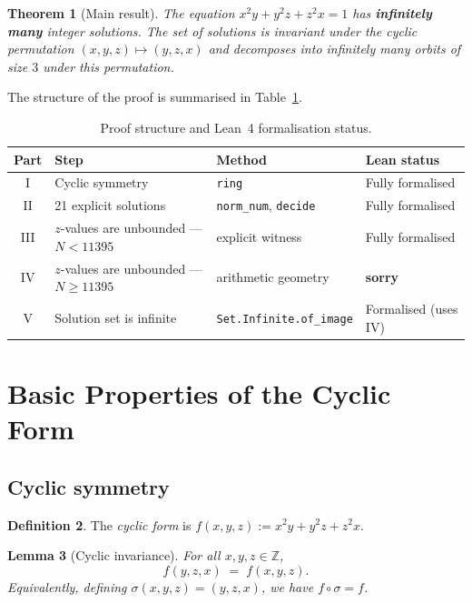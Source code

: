 \documentclass[12pt,a4paper]{article}
\newtheorem{theorem}{Theorem}[section]
\newtheorem{lemma}[theorem]{Lemma}
\theoremstyle{definition}
\newtheorem{definition}[theorem]{Definition}
\newcommand{\Z}{\mathbb{Z}}
\begin{document}
\begin{theorem}[Main result]\label{thm:main}
  The equation $x^2y + y^2z + z^2x = 1$ has \textbf{infinitely many}
  integer solutions.  The set of solutions is invariant under the
  cyclic permutation $(x,y,z)\mapsto(y,z,x)$ and decomposes into
  infinitely many orbits of size $3$ under this permutation.
\end{theorem}

The structure of the proof is summarised in Table~\ref{tab:overview}.

\begin{table}[h]
\centering
\caption{Proof structure and Lean~4 formalisation status.}
\label{tab:overview}
\begin{tabular}{clll}
\toprule
\textbf{Part} & \textbf{Step} & \textbf{Method} & \textbf{Lean status} \\
\midrule
I   & Cyclic symmetry & \texttt{ring} & Fully formalised \\
II  & 21 explicit solutions & \texttt{norm\_num}, \texttt{decide} & Fully formalised \\
III & $z$-values are unbounded — $N < 11395$ & explicit witness & Fully formalised \\
IV  & $z$-values are unbounded — $N \ge 11395$ & arithmetic geometry & \textbf{sorry} \\
V   & Solution set is infinite & \texttt{Set.Infinite.of\_image} & Formalised (uses IV) \\
\bottomrule
\end{tabular}
\end{table}

\section{Basic Properties of the Cyclic Form}\label{sec:basic}

\subsection{Cyclic symmetry}

\begin{definition}
  The \emph{cyclic form} is
  $f(x,y,z) := x^2y + y^2z + z^2x$.
\end{definition}

\begin{lemma}[Cyclic invariance]\label{lem:cyclic}
  For all $x,y,z\in\Z$,
  \[
    f(y,z,x) \;=\; f(x,y,z).
  \]
  Equivalently, defining $\sigma(x,y,z) = (y,z,x)$, we have
  $f \circ \sigma = f$.
\end{lemma}
\end{document}

